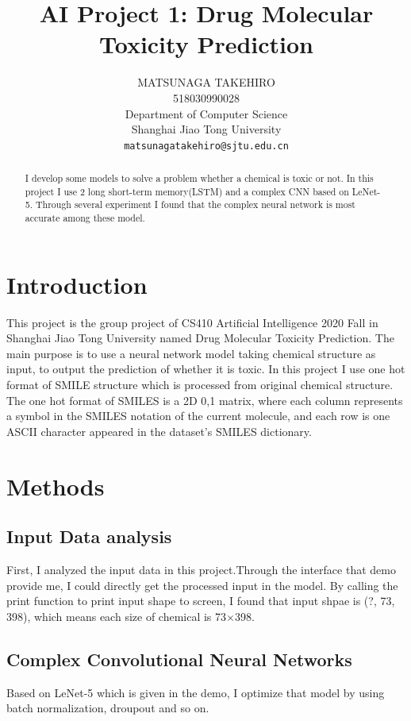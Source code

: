 \documentclass{article}
\title{AI Project 1: Drug Molecular Toxicity Prediction}
\author{
MATSUNAGA TAKEHIRO \\
518030990028\\
Department of Computer Science\\
Shanghai Jiao Tong University\\
\texttt{matsunagatakehiro@sjtu.edu.cn} \\
}
\begin{document}
\maketitle

\begin{abstract}
 I develop some models to solve a problem whether a chemical is toxic or not. In this project I use 2 long short-term memory(LSTM) and a complex CNN based on LeNet-5. Through several experiment I found that the complex neural network is most accurate among these model.
\end{abstract}

\section{Introduction}
This project is the group project of CS410 Artificial Intelligence 2020 Fall in Shanghai Jiao Tong University named Drug Molecular Toxicity Prediction. The main purpose is to use a neural network model taking chemical structure as input, to output the prediction of whether it is toxic. In this project I use one hot format of SMILE structure which is processed from original chemical structure. The one hot format of SMILES is a 2D {0,1} matrix, where each column represents a symbol in the SMILES notation of the current molecule, and each row is one ASCII character appeared in the dataset’s SMILES dictionary.


\section{Methods}
\subsection{Input Data analysis}
First, I analyzed the input data in this project.Through the interface that demo provide me, I could directly get the processed input in the model. By calling the print function to print input shape to screen, I found that input shpae is (?, 73, 398), which means each size of chemical is 73$\times$398. 

\subsection{Complex Convolutional Neural Networks}
Based on LeNet-5 which is given in the demo, I optimize that model by using batch normalization, droupout and so on. 
\end{document}
